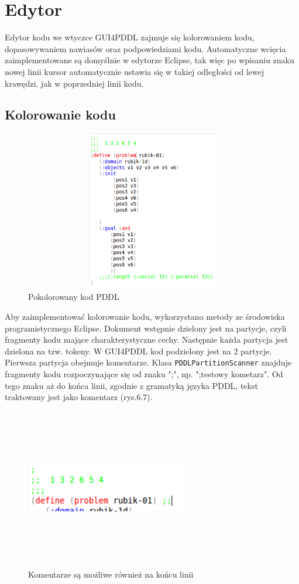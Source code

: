 \section{Edytor}
Edytor kodu we wtyczce GUI4PDDL zajmuje się kolorowaniem kodu, dopasowywaniem nawiasów oraz podpowiedziami kodu. Automatyczne wcięcia zaimplementowane są domyślnie w edytorze Eclipse, tak więc po wpisaniu znaku nowej linii kursor automatycznie ustawia się w takiej odległości od lewej krawędzi, jak w poprzedniej linii kodu.
\subsection{Kolorowanie kodu}
\begin{figure}[h]
  \centering
    \includegraphics[width=13cm,height=7cm,keepaspectratio]{img/colored-code.png}
    \caption{Pokolorowany kod PDDL}
    \label{ana_structure}
\end{figure}
Aby zaimplementować kolorowanie kodu, wykorzystano metody ze środowiska programistycznego Eclipse. Dokument wstępnie dzielony jest na partycje, czyli fragmenty kodu mające charakterystyczne cechy. Następnie każda partycja jest dzielona na tzw. tokeny. W GUI4PDDL kod podzielony jest na 2 partycje. Pierwsza partycja obejmuje komentarze. Klasa \texttt{PDDLPartitionScanner} znajduje fragmenty kodu rozpoczynające się od znaku ";", np.  ";testowy kometarz". Od tego znaku aż do końca linii, zgodnie z gramatyką języka PDDL, tekst traktowany jest jako komentarz (rys.6.7).
\begin{figure}[h]
  \centering
    \includegraphics[width=7cm,height=7cm,keepaspectratio]{img/comments.png}
    \caption{Komentarze są możliwe również na końcu linii}
    \label{ana_structure}
\end{figure}
